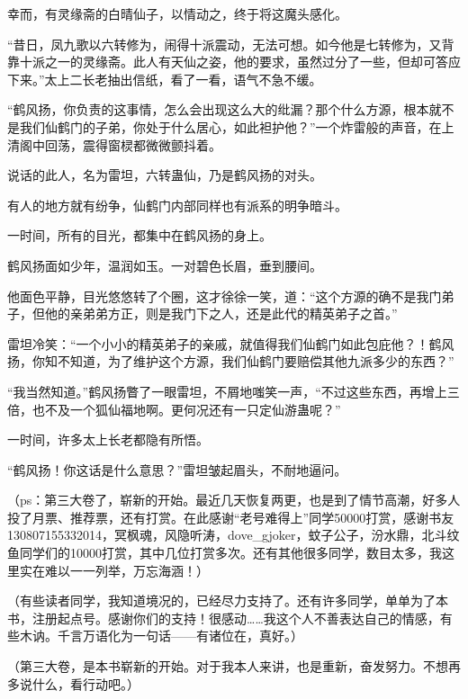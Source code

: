 \begin{this_body}
幸而，有灵缘斋的白晴仙子，以情动之，终于将这魔头感化。

“昔日，凤九歌以六转修为，闹得十派震动，无法可想。如今他是七转修为，又背靠十派之一的灵缘斋。此人有天仙之姿，他的要求，虽然过分了一些，但却可答应下来。”太上二长老抽出信纸，看了一看，语气不急不缓。

“鹤风扬，你负责的这事情，怎么会出现这么大的纰漏？那个什么方源，根本就不是我们仙鹤门的子弟，你处于什么居心，如此袒护他？”一个炸雷般的声音，在上清阁中回荡，震得窗棂都微微颤抖着。

说话的此人，名为雷坦，六转蛊仙，乃是鹤风扬的对头。

有人的地方就有纷争，仙鹤门内部同样也有派系的明争暗斗。

一时间，所有的目光，都集中在鹤风扬的身上。

鹤风扬面如少年，温润如玉。一对碧色长眉，垂到腰间。

他面色平静，目光悠悠转了个圈，这才徐徐一笑，道：“这个方源的确不是我门弟子，但他的亲弟弟方正，则是我门下之人，还是此代的精英弟子之首。”

雷坦冷笑：“一个小小的精英弟子的亲戚，就值得我们仙鹤门如此包庇他？！鹤风扬，你知不知道，为了维护这个方源，我们仙鹤门要赔偿其他九派多少的东西？”

“我当然知道。”鹤风扬瞥了一眼雷坦，不屑地嗤笑一声，“不过这些东西，再增上三倍，也不及一个狐仙福地啊。更何况还有一只定仙游蛊呢？”

一时间，许多太上长老都隐有所悟。

“鹤风扬！你这话是什么意思？”雷坦皱起眉头，不耐地逼问。

（ps：第三大卷了，崭新的开始。最近几天恢复两更，也是到了情节高潮，好多人投了月票、推荐票，还有打赏。在此感谢“老号难得上”同学50000打赏，感谢书友130807155332014，冥枫魂，风隐听涛，dove\_gjoker，蚊子公子，汾水鼎，北斗纹鱼同学们的10000打赏，其中几位打赏多次。还有其他很多同学，数目太多，我这里实在难以一一列举，万忘海涵！）

（有些读者同学，我知道境况的，已经尽力支持了。还有许多同学，单单为了本书，注册起点号。感谢你们的支持！很感动……我这个人不善表达自己的情感，有些木讷。千言万语化为一句话——有诸位在，真好。）

（第三大卷，是本书崭新的开始。对于我本人来讲，也是重新，奋发努力。不想再多说什么，看行动吧。）

\end{this_body}

